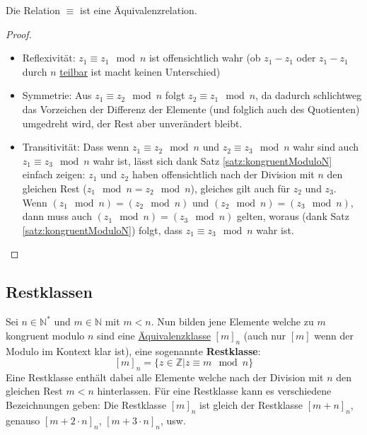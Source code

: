 \documentclass[../../main.tex]{subfiles}
\begin{document}
	\begin{theorem}
		Die Relation $\equiv$ ist eine Äquivalenzrelation.
		\begin{proof}\hspace*{1cm}
			\begin{itemize}
				\item Reflexivität: $z_1 \equiv z_1 \mod n$ ist offensichtlich wahr (ob $z_1-z_1$ oder $z_1-z_1$ durch $n$ \hyperref[def:teilbar]{teilbar} ist macht keinen Unterschied)
				\item Symmetrie: Aus $z_1 \equiv z_2 \mod n$ folgt $z_2 \equiv z_1 \mod n$, da dadurch schlichtweg das Vorzeichen der Differenz der Elemente (und folglich auch des Quotienten) umgedreht wird, der Rest aber unverändert bleibt. 
				\item Transitivität: Dass wenn $z_1 \equiv z_2 \mod n$ und $z_2 \equiv z_3 \mod n$ wahr sind auch $z_1 \equiv z_3 \mod n$ wahr ist, lässt sich dank Satz \ref{satz:kongruentModuloN} einfach zeigen: $z_1$ und $z_2$ haben offensichtlich nach der Division mit $n$ den gleichen Rest ($z_1 \mod n = z_2 \mod n$), gleiches gilt auch für $z_2$ und $z_3$. Wenn $(z_1 \mod n) = (z_2 \mod n)$ und $(z_2 \mod n) = (z_3 \mod n)$, dann muss auch $(z_1 \mod n) = (z_3 \mod n)$ gelten, woraus (dank Satz \ref{satz:kongruentModuloN}) folgt, dass $z_1 \equiv z_3 \mod n$ wahr ist.
			\end{itemize}
		\end{proof}
	\end{theorem}

	\subsection{Restklassen}
	\begin{definition}[Restklasse]
		\label{def:Restklasse}
		Sei $n \in \mathbb{N}^*$ und $m \in \mathbb{N}$ mit $m < n$. Nun bilden jene Elemente welche zu $m$ kongruent modulo $n$ sind eine \hyperref[def:Äquivalenzklasse]{Äquivalenzklasse} $[m]_n$ (auch nur $[m]$ wenn der Modulo im Kontext klar ist), eine sogenannte \textbf{Restklasse}: $$[m]_n = \{z \in \mathbb{Z} | z \equiv m \mod n \}$$ Eine Restklasse enthält dabei alle Elemente welche nach der Division mit $n$ den gleichen Rest $m<n$ hinterlassen. Für eine Restklasse kann es verschiedene Bezeichnungen geben: Die Restklasse $[m]_n$ ist gleich der Restklasse $[m+n]_n$, genauso $[m+2\cdot n]_n$, $[m+3\cdot n]_n$, usw.
	\end{definition}
	
\end{document}
